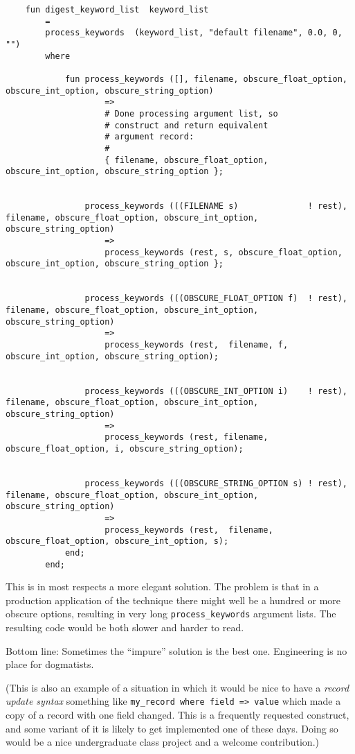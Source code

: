 \begin{verbatim}
    fun digest_keyword_list  keyword_list
        =
        process_keywords  (keyword_list, "default filename", 0.0, 0, "")
        where

            fun process_keywords ([], filename, obscure_float_option, obscure_int_option, obscure_string_option)
                    =>
                    # Done processing argument list, so
                    # construct and return equivalent
                    # argument record:
                    # 
                    { filename, obscure_float_option, obscure_int_option, obscure_string_option };


                process_keywords (((FILENAME s)              ! rest), filename, obscure_float_option, obscure_int_option, obscure_string_option)
                    =>
                    process_keywords (rest, s, obscure_float_option, obscure_int_option, obscure_string_option };


                process_keywords (((OBSCURE_FLOAT_OPTION f)  ! rest), filename, obscure_float_option, obscure_int_option, obscure_string_option)
                    =>
                    process_keywords (rest,  filename, f, obscure_int_option, obscure_string_option);


                process_keywords (((OBSCURE_INT_OPTION i)    ! rest), filename, obscure_float_option, obscure_int_option, obscure_string_option)
                    =>
                    process_keywords (rest, filename, obscure_float_option, i, obscure_string_option);


                process_keywords (((OBSCURE_STRING_OPTION s) ! rest), filename, obscure_float_option, obscure_int_option, obscure_string_option)
                    =>
                    process_keywords (rest,  filename, obscure_float_option, obscure_int_option, s);
            end;
        end;
\end{verbatim}

This is in most respects a more elegant solution.  The problem is that in a production 
application of the technique there might well be a hundred or more obscure options, resulting 
in very long {\tt process\_keywords} argument lists.  The resulting code would be both 
slower and harder to read.

Bottom line:  Sometimes the ``impure'' solution is the best one.  Engineering is no 
place for dogmatists.

(This is also an example of a situation in which it would be nice to have a {\it record 
update syntax} something like {\tt my\_record where field => value} which made a copy of 
a record with one field changed.  This is a frequently requested construct, and some 
variant of it is likely to get implemented one of these days.  Doing so would be a 
nice undergraduate class project and a welcome contribution.) 

